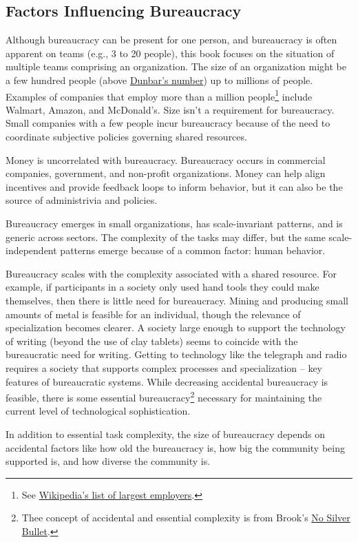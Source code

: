 \subsection*{Factors Influencing Bureaucracy}

Although bureaucracy can be present for one person, and bureaucracy is often apparent on teams (e.g., 3 to 20 people), this book focuses on the situation of multiple teams comprising an organization. The size of an organization might be a few hundred people (above \href{https://en.wikipedia.org/wiki/Dunbar's_number}{Dunbar's number})\iftoggle{WPinmargin}{\marginpar{[Wikipedia] Dunbar's\\number}}{}
 up to millions of people. 
Examples of companies that employ more than a million people\footnote{See \href{https://en.wikipedia.org/wiki/List_of_largest_employers}{Wikipedia's list of largest employers}.
} include Walmart, Amazon, and McDonald's. Size isn't a requirement for bureaucracy. Small companies with a few people incur bureaucracy because of the need to coordinate subjective policies governing shared resources. 

Money is uncorrelated with bureaucracy. Bureaucracy occurs in commercial companies, government, and non-profit organizations. Money can help align incentives and provide feedback loops to inform behavior, but it can also be the source of administrivia and policies. 

Bureaucracy emerges in small organizations, has scale-invariant patterns, and is generic across sectors. The complexity of the tasks may differ, but the same scale-independent patterns  emerge because of a common factor: human behavior.

Bureaucracy scales with the complexity associated with a shared resource. For example, if participants in a society only used hand tools they could make themselves, then there is little need for bureaucracy. Mining and producing small amounts of metal is feasible for an individual, though the relevance of specialization becomes clearer. A society large enough to support the technology of writing (beyond the use of clay tablets) seems to coincide with the bureaucratic need for writing. Getting to technology like the telegraph and radio requires a society that supports complex processes and specialization -- key features of bureaucratic systems. While decreasing accidental bureaucracy is feasible, there is some essential bureaucracy\footnote{Thee concept of accidental and essential complexity is from Brook's \href{https://en.wikipedia.org/wiki/No_Silver_Bullet\#Summary}{No Silver Bullet}.
} necessary for maintaining the current level of technological sophistication. 


In addition to essential task complexity, the size of bureaucracy depends on accidental factors like how old the bureaucracy is, how big the community being supported is, and how diverse the community is.


